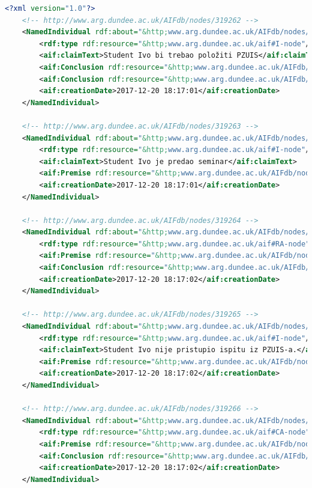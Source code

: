 \lstset{language=XML}
\begin{lstlisting}[caption={Primjer AIF RDF dokumenta},label={lst:aif_rdf},language=XML, captionpos=b]
<?xml version="1.0"?>
    <!-- http://www.arg.dundee.ac.uk/AIFdb/nodes/319262 -->
    <NamedIndividual rdf:about="&http;www.arg.dundee.ac.uk/AIFdb/nodes/319262">
        <rdf:type rdf:resource="&http;www.arg.dundee.ac.uk/aif#I-node"/>
        <aif:claimText>Student Ivo bi trebao položiti PZUIS</aif:claimText>
        <aif:Conclusion rdf:resource="&http;www.arg.dundee.ac.uk/AIFdb/nodes/319264"/>
        <aif:Conclusion rdf:resource="&http;www.arg.dundee.ac.uk/AIFdb/nodes/319266"/>
        <aif:creationDate>2017-12-20 18:17:01</aif:creationDate>
    </NamedIndividual>

    <!-- http://www.arg.dundee.ac.uk/AIFdb/nodes/319263 -->
    <NamedIndividual rdf:about="&http;www.arg.dundee.ac.uk/AIFdb/nodes/319263">
        <rdf:type rdf:resource="&http;www.arg.dundee.ac.uk/aif#I-node"/>
        <aif:claimText>Student Ivo je predao seminar</aif:claimText>
        <aif:Premise rdf:resource="&http;www.arg.dundee.ac.uk/AIFdb/nodes/319264"/>
        <aif:creationDate>2017-12-20 18:17:01</aif:creationDate>
    </NamedIndividual>

    <!-- http://www.arg.dundee.ac.uk/AIFdb/nodes/319264 -->
    <NamedIndividual rdf:about="&http;www.arg.dundee.ac.uk/AIFdb/nodes/319264">
        <rdf:type rdf:resource="&http;www.arg.dundee.ac.uk/aif#RA-node"/>
        <aif:Premise rdf:resource="&http;www.arg.dundee.ac.uk/AIFdb/nodes/319263"/>
        <aif:Conclusion rdf:resource="&http;www.arg.dundee.ac.uk/AIFdb/nodes/319262"/>
        <aif:creationDate>2017-12-20 18:17:02</aif:creationDate>
    </NamedIndividual>

    <!-- http://www.arg.dundee.ac.uk/AIFdb/nodes/319265 -->
    <NamedIndividual rdf:about="&http;www.arg.dundee.ac.uk/AIFdb/nodes/319265">
        <rdf:type rdf:resource="&http;www.arg.dundee.ac.uk/aif#I-node"/>
        <aif:claimText>Student Ivo nije pristupio ispitu iz PZUIS-a.</aif:claimText>
        <aif:Premise rdf:resource="&http;www.arg.dundee.ac.uk/AIFdb/nodes/319266"/>
        <aif:creationDate>2017-12-20 18:17:02</aif:creationDate>
    </NamedIndividual>

    <!-- http://www.arg.dundee.ac.uk/AIFdb/nodes/319266 -->
    <NamedIndividual rdf:about="&http;www.arg.dundee.ac.uk/AIFdb/nodes/319266">
        <rdf:type rdf:resource="&http;www.arg.dundee.ac.uk/aif#CA-node"/>
        <aif:Premise rdf:resource="&http;www.arg.dundee.ac.uk/AIFdb/nodes/319265"/>
        <aif:Conclusion rdf:resource="&http;www.arg.dundee.ac.uk/AIFdb/nodes/319262"/>
        <aif:creationDate>2017-12-20 18:17:02</aif:creationDate>
    </NamedIndividual>
\end{lstlisting}

